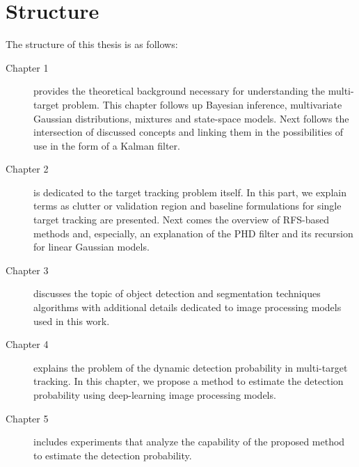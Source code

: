 \section{Structure}
The structure of this thesis is as follows:
\begin{description}
  \item[Chapter 1] provides the theoretical background necessary for understanding the multi-target problem.
  This chapter follows up Bayesian inference, multivariate Gaussian distributions, mixtures and state-space models.
  Next follows the intersection of discussed concepts and linking them in the possibilities of use in the form of a
  Kalman filter.

  \item[Chapter 2] is dedicated to the target tracking problem itself. In this part, we explain terms as clutter or
  validation region and baseline formulations for single target tracking are presented. Next comes the overview of
  RFS-based
  methods and, especially, an explanation of the PHD filter and its recursion for linear Gaussian models.

  \item[Chapter 3] discusses the topic of object detection and segmentation techniques algorithms with additional
  details
  dedicated to image processing models used in this work.

  \item[Chapter 4] explains the problem of the dynamic detection probability in multi-target tracking. In this
  chapter, we
  propose a method to estimate the detection probability using deep-learning image processing models.
  \item[Chapter 5] includes experiments that analyze the capability of the proposed method to estimate the detection
  probability.
\end{description}

